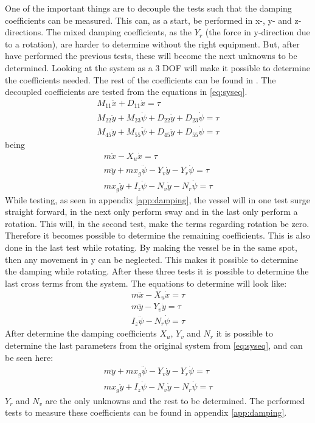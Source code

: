 One of the important things are to decouple the tests such that the damping coefficients can be measured. This can, as a start, be performed in x-, y- and z-directions. The mixed damping coefficients, as the $Y_r$ (the force in y-direction due to a rotation), are harder to determine without the right equipment. But, after have performed the previous tests, these will become the next unknowns to be determined. Looking at the system as a 3 \ac{DOF} will make it possible to determine the coefficients needed. The rest of the coefficients can be found in . The decoupled coefficients are tested from the equations in \ref{eq:syseq}.
\begin{subequations}
\begin{align}
M_{11} \ddot x + D_{11} \dot x = \tau\\
M_{22} \ddot y + M_{23} \ddot \psi + D_{22} \dot y + D_{23} \dot \psi = \tau\\
M_{45} \ddot y + M_{55} \ddot \psi + D_{45} \dot y + D_{55} \dot \psi = \tau
\end{align}
\end{subequations}
being
\begin{subequations}
\begin{align}
m \ddot x - X_u \dot x = \tau\\
m \ddot y + mx_g\ddot\psi - Y_v \dot y - Y_r \dot \psi = \tau\\
mx_g \ddot y + I_z\ddot \psi - N_v \dot y - N_r \dot \psi = \tau
\end{align}
\label{eq:syseq}
\end{subequations}
While testing, as seen in appendix \ref{app:damping}, the vessel will in one test surge straight forward, in the next only perform sway and in the last only perform a rotation. This will, in the second test, make the terms regarding rotation be zero. Therefore it becomes possible to determine the remaining coefficients. This is also done in the last test while rotating. By making the vessel be in the same spot, then any movement in y can be neglected. This makes it possible to determine the damping while rotating. After these three tests it is possible to determine the last cross terms from the system. The equations to determine will look like:
\begin{align}
m \ddot x - X_u \dot x = \tau\\
m \ddot y - Y_v \dot y = \tau\\
I_z\ddot \psi - N_r \dot \psi = \tau
\end{align}
After determine the damping coefficients $X_u$, $Y_v$ and $N_r$ it is possible to determine the last parameters from the original system from \ref{eq:syseq}, and can be seen here:
\begin{align}
m \ddot y + mx_g\ddot\psi - Y_v \dot y - Y_r \dot \psi = \tau\\
mx_g \ddot y + I_z\ddot \psi - N_v \dot y - N_r \dot \psi = \tau
\end{align}
$Y_r$ and $N_v$ are the only unknowns and the rest to be determined. The performed tests to measure these coefficients can be found in appendix \ref{app:damping}.
